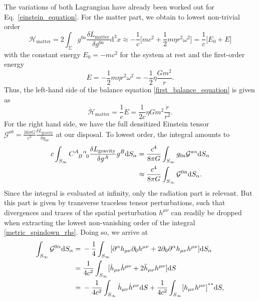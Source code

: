 The variations of both Lagrangian have already been worked out for Eq.~\eqref{einstein_equation}. For the matter part, we obtain to lowest non-trivial order
\begin{equation}
  \mathcal H_\text{matter} = 2\int_\Sigma g^{0a}\frac{\delta L_\text{matter}}{\delta g^{0a}}\mathrm d^3x \approx -\frac{1}{c} \lbrack mc^2 + \frac{1}{2}m\eta r^2\omega^2\rbrack = \frac{1}{c}\lbrack E_0 + E\rbrack
\end{equation}
with the constant energy $E_0 = -mc^2$ for the system at rest and the first-order energy
\begin{equation}
  E = -\frac{1}{2}m\eta r^2\omega^2 = -\frac{1}{2} \eta \frac{Gm^2}{r}.
\end{equation}
Thus, the left-hand side of the balance equation \eqref{first_balance_equation} is given as
\begin{equation}\label{balance_lhs}
  \dot{\mathcal H}_\text{matter} = \frac{1}{c}\dot E = \frac{1}{2c}\eta G m^2 \frac{\dot r}{r^2}.
\end{equation}
For the right hand side, we have the full densitized Einstein tensor $\mathcal G^{ab} = \frac{16\pi G}{c^3} \frac{\delta L_\text{gravity}}{\delta g_{ab}}$ at our disposal. To lowest order, the integral amounts to
\begin{equation}\label{metric_spindown_rhs}
  \begin{aligned}
    c\int_{S_\infty} \gmc{A}{B}{\alpha}{0} \frac{\delta L_\text{gravity}}{\delta g^A}g^B\mathrm dS_\alpha = {} & \frac{c^4}{8\pi G}\int_{S_\infty} g_{0a} \mathcal G^{a\alpha}\mathrm dS_\alpha \\
    \approx {} & \frac{c^4}{8\pi G} \int_{S_\infty} \mathcal G^{0\alpha} \mathrm dS_\alpha.
  \end{aligned}
\end{equation}
Since the integral is evaluated at infinity, only the radiation part is relevant. But this part is given by transverse traceless tensor perturbations, such that divergences and traces of the spatial perturbation $h^{\mu\nu}$ can readily be dropped when extracting the lowest non-vanishing order of the integral \eqref{metric_spindown_rhs}. Doing so, we arrive at
\begin{equation}
  \begin{aligned}
    \int_{S_\infty} \mathcal G^{0\alpha}\mathrm dS_\alpha = {} & -\frac{1}{4} \int_{S_\infty} \lbrack \partial^\alpha h_{\mu\nu}\partial_0 h^{\mu\nu} + 2\partial_0\partial^\alpha h_{\mu\nu} h^{\mu\nu}\rbrack \mathrm dS_\alpha \\
    = {} & \frac{1}{4c^2} \int_{S_\infty} \lbrack \dot h_{\mu\nu}\dot h^{\mu\nu} + 2\ddot h_{\mu\nu} h^{\mu\nu}\rbrack \mathrm dS \\
  = {} & -\frac{1}{4c^2} \int_{S_\infty} \dot h_{\mu\nu}\dot h^{\mu\nu} \mathrm dS + \frac{1}{4c^2}\int_{S_\infty} \lbrack h_{\mu\nu}h^{\mu\nu}\rbrack^{\scalebox{1.5}{$\cdot\cdot$}} \mathrm dS,
  \end{aligned}
\end{equation}
